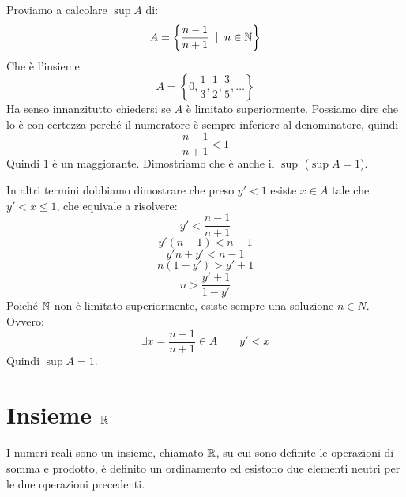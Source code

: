 \begin{example}
Proviamo a calcolare $\sup A$ di:
\begin{equation*}
A = \left\{\frac{n-1}{n+1} \; \mid \; n \in \mathbb N \right\}
\end{equation*}
Che è l'insieme:
\begin{equation*}
A = \left\{0, \frac{1}{3}, \frac{1}{2}, \frac{3}{5}, \ldots \right\}
\end{equation*}
Ha senso innanzitutto chiedersi se $A$ è limitato superiormente. Possiamo dire che lo è con certezza perché il numeratore è sempre inferiore al denominatore, quindi
\begin{equation*}
\frac{n-1}{n+1} < 1
\end{equation*}
Quindi $1$ è un maggiorante. Dimostriamo che è anche il $\sup$ ($\sup A = 1$).

In altri termini dobbiamo dimostrare che preso $y' < 1$ esiste $x \in A$ tale che $y' < x \le 1$, che equivale a risolvere:
\begin{equation*}
y' < \frac{n-1}{n+1}
\end{equation*}
\begin{equation*}
y' (n+1) < n-1
\end{equation*}
\begin{equation*}
y'n + y' < n -1
\end{equation*}
\begin{equation*}
n(1-y')>y'+1
\end{equation*}
\begin{equation*}
n > \frac{y'+1}{1-y'}
\end{equation*}
Poiché $\mathbb N$ non è limitato superiormente, esiste sempre una soluzione $n \in N$. Ovvero:
\begin{equation*}
\exists x = \frac{n-1}{n+1} \in A \qquad y' < x
\end{equation*}
Quindi $\sup A = 1$.
\end{example}

\section{Insieme $\mathbb R$}

I numeri reali sono un insieme, chiamato $\mathbb R$, su cui sono definite le operazioni di somma e prodotto, è definito un ordinamento ed esistono due elementi neutri per le due operazioni precedenti.

